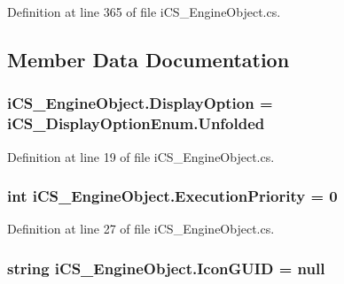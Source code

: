 Definition at line 365 of file i\+C\+S\+\_\+\+Engine\+Object.\+cs.



\subsection{Member Data Documentation}
\hypertarget{classi_c_s___engine_object_a1751c4c32ddd121849d72e37e89f6213}{
\subsubsection[{Display\+Option}]{ i\+C\+S\+\_\+\+Engine\+Object.\+Display\+Option = {\bf i\+C\+S\+\_\+\+Display\+Option\+Enum.\+Unfolded}}}\label{classi_c_s___engine_object_a1751c4c32ddd121849d72e37e89f6213}


Definition at line 19 of file i\+C\+S\+\_\+\+Engine\+Object.\+cs.

\hypertarget{classi_c_s___engine_object_af3ec0e7d714635114da8076d8a46efb6}{
\subsubsection[{Execution\+Priority}]{\setlength{\rightskip}{0pt plus 5cm}int i\+C\+S\+\_\+\+Engine\+Object.\+Execution\+Priority = 0}}\label{classi_c_s___engine_object_af3ec0e7d714635114da8076d8a46efb6}


Definition at line 27 of file i\+C\+S\+\_\+\+Engine\+Object.\+cs.

\hypertarget{classi_c_s___engine_object_a73b91855bfa9af07ca71cb6e659c94ba}{
\subsubsection[{Icon\+G\+U\+I\+D}]{\setlength{\rightskip}{0pt plus 5cm}string i\+C\+S\+\_\+\+Engine\+Object.\+Icon\+G\+U\+I\+D = null}}\label{classi_c_s___engine_object_a73b91855bfa9af07ca71cb6e659c94ba}


